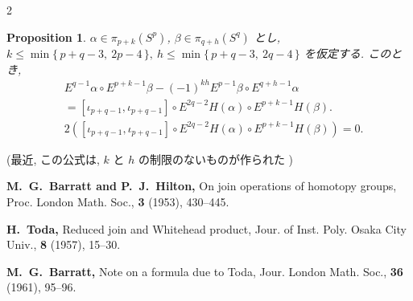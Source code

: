 \documentclass[10pt, leqno]{ltjsarticle}
\numberwithin{equation}{section}
\theoremstyle{plain}
\newtheorem{proposition}[theorem]{Proposition}
\theoremstyle{definition}
\theoremstyle{remark}
\begin{document}
\begin{paracol}{2}
\begin{proposition}\label{prop:3.2}
$\alpha\in\pi_{p+k}(S^p)$, $\beta\in\pi_{q+h}(S^q)$ とし, \\
\(k\le \min\{\,p+q-3,\ 2p-4\,\},\
h\le \min\{\,p+q-3,\ 2q-4\,\}\)
を仮定する. このとき,
\[
\begin{align*}
& E^{q-1}\alpha \circ E^{p+k-1}\beta
 - (-1)^{kh}E^{p-1}\beta\circ E^{q+h-1}\alpha  \\
& = [\iota_{p+q-1}, \iota_{p+q-1}]\circ 
E^{2q-2}H(\alpha)\circ E^{p+k-1}H(\beta) .\\
& 2([\iota_{p+q-1}, \iota_{p+q-1}]\circ 
E^{2q-2}H(\alpha)\circ E^{p+k-1}H(\beta)) = 0.
\end{align*}
\]
\end{proposition}
(最近, この公式は, \(k\) と \(h\) の制限のないものが作られた \cite{Barratt1961})

\switchcolumn

\noindent
\textbf{
\cite{BarrattHilton1953}
M.~G.~Barratt and P.~J.~Hilton,}
\newblock On join operations of homotopy groups,
\newblock Proc. London Math. Soc., {\bf 3} (1953), 430--445.

\noindent
\textbf{
\cite{Toda1957}
H.~Toda,}
\newblock Reduced join and Whitehead product,
\newblock Jour. of Inst. Poly. Osaka City Univ., {\bf 8} (1957), 15--30.

\noindent
\textbf{
\cite{Barratt1961}
M.~G.~Barratt,}
\newblock Note on a formula due to Toda,
\newblock Jour. London Math. Soc., {\bf 36} (1961), 95--96.

\end{paracol}
\end{document}
